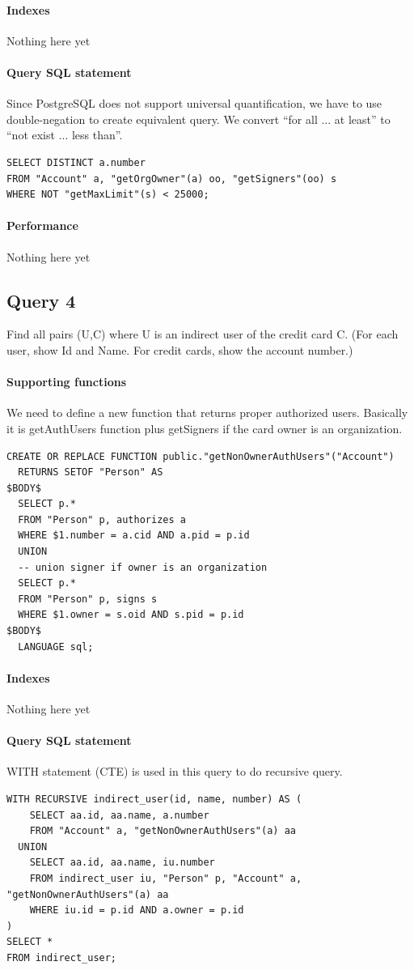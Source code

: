 \documentclass[11pt]{article}
\begin{document}
\paragraph{Indexes} Nothing here yet

\paragraph{Query SQL statement} Since PostgreSQL does not support universal quantification, we have to use double-negation to create equivalent query. We convert ``for all ... at least'' to ``not exist ... less than''.
\begin{verbatim}
SELECT DISTINCT a.number
FROM "Account" a, "getOrgOwner"(a) oo, "getSigners"(oo) s
WHERE NOT "getMaxLimit"(s) < 25000;
\end{verbatim}

\paragraph{Performance} Nothing here yet

\subsection{Query 4}
Find all pairs (U,C) where U is an indirect user of the credit card C. (For each user, show Id and Name. For credit cards, show the account number.)

\paragraph{Supporting functions} We need to define a new function that returns proper authorized users. Basically it is getAuthUsers function plus getSigners if the card owner is an organization.
\begin{verbatim}
CREATE OR REPLACE FUNCTION public."getNonOwnerAuthUsers"("Account")
  RETURNS SETOF "Person" AS
$BODY$
  SELECT p.*
  FROM "Person" p, authorizes a
  WHERE $1.number = a.cid AND a.pid = p.id
  UNION
  -- union signer if owner is an organization
  SELECT p.*
  FROM "Person" p, signs s
  WHERE $1.owner = s.oid AND s.pid = p.id
$BODY$
  LANGUAGE sql;
\end{verbatim}

\paragraph{Indexes} Nothing here yet

\paragraph{Query SQL statement} WITH statement (CTE) is used in this query to do recursive query.
\begin{verbatim}
WITH RECURSIVE indirect_user(id, name, number) AS (
    SELECT aa.id, aa.name, a.number
    FROM "Account" a, "getNonOwnerAuthUsers"(a) aa
  UNION
    SELECT aa.id, aa.name, iu.number
    FROM indirect_user iu, "Person" p, "Account" a, "getNonOwnerAuthUsers"(a) aa
    WHERE iu.id = p.id AND a.owner = p.id
)
SELECT *
FROM indirect_user;
\end{verbatim}
\end{document}

